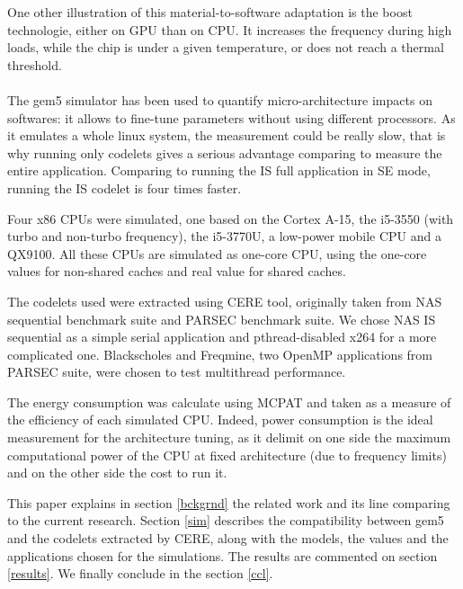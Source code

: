 \documentclass{article}
\begin{document}
\begin{multicols}{2}
One other illustration of this material-to-software adaptation is the boost technologie, either on GPU than on CPU. It increases the frequency during high loads, while the chip is under a given temperature, or does not reach a thermal threshold. %

\paragraph{}
The gem5 simulator\cite{gem5-sim} has been used to quantify micro-architecture impacts on softwares: it allows to fine-tune parameters without using different processors. As it emulates a whole linux system, the measurement could be really slow, that is why running only codelets gives a serious advantage comparing to measure the entire application. Comparing to running the IS full application in SE mode, running the IS codelet is four times faster.

Four x86 CPUs were simulated, one based on the Cortex A-15\cite{DBLP:conf/samos/EndoCC14}, the i5-3550 (with turbo and non-turbo frequency), the i5-3770U, a low-power mobile CPU and a QX9100. All these CPUs are simulated as one-core CPU, using the one-core values for non-shared caches and real value for shared caches.

The codelets used were extracted using CERE\cite{CERE} tool, originally taken from NAS\cite{NAS} sequential benchmark suite and PARSEC\cite{PARSEC} benchmark suite. We chose NAS IS sequential as a simple serial application and pthread-disabled x264 for a more complicated one. Blackscholes and Freqmine, two OpenMP applications from PARSEC suite, were chosen to test multithread performance.


The energy consumption was calculate using MCPAT\cite{MCPAT} and taken as a measure of the efficiency of each simulated CPU. Indeed, power consumption is the ideal measurement for the architecture tuning, as it delimit on one side the maximum computational power of the CPU at fixed architecture (due to frequency limits) and on the other side the cost to run it.

This paper explains in section \ref{bckgrnd} the related work and its line comparing to the current research. Section \ref{sim} describes the compatibility between gem5 and the codelets extracted by CERE, along with the models, the values and the applications chosen for the simulations. The results are commented on section \ref{results}. We finally conclude in the section \ref{ccl}.



\end{multicols}
\end{document}
